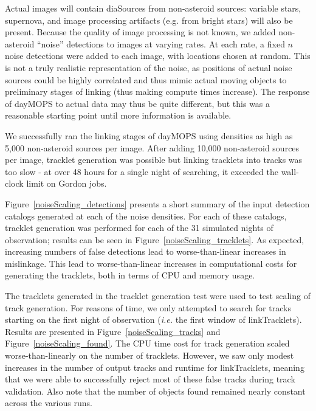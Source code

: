 Actual images will contain diaSources from non-asteroid sources:
variable stars, supernova, and image processing artifacts (e.g. from
bright stars) will also be present.  Because the quality of image
processing is not known, we added non-asteroid ``noise'' detections to
images at varying rates.  At each rate, a fixed $n$ noise detections
were added to each image, with locations chosen at random. This is not
a truly realistic representation of the noise, as positions of actual
noise sources could be highly correlated and thus mimic actual moving
objects to preliminary stages of linking (thus making compute times
increase). The response of dayMOPS to actual data may thus be quite
different, but this was a reasonable starting point until more
information is available. 

We successfully ran the linking stages of dayMOPS using densities as high as 5,000 non-asteroid
sources per image.  After adding 10,000 non-asteroid sources per
image, tracklet generation was possible but linking tracklets into
tracks was too slow - at over 48 hours for a single night of
searching, it exceeded the wall-clock limit on Gordon jobs.

Figure~\ref{noiseScaling_detections} presents a short summary of the input
detection catalogs generated at each of the noise densities.  For each
of these catalogs, tracklet generation was performed for each of the
31 simulated nights of observation; results can be seen in
Figure~\ref{noiseScaling_tracklets}.  As expected, increasing numbers
of false detections lead to worse-than-linear increases in mislinkage.
This lead to worse-than-linear increases in computational costs for generating the
tracklets, both in terms of CPU and memory usage.

The tracklets generated in the tracklet generation test were used to
test scaling of track generation.  For reasons of time, we only
attempted to search for tracks starting on the first night of
observation ({\it i.e.} the first window of linkTracklets).  Results are presented in
Figure~\ref{noiseScaling_tracks} and Figure~\ref{noiseScaling_found}.
The CPU time cost for track generation scaled worse-than-linearly on
the number of tracklets.  However, we saw only modest increases in the
number of output tracks and runtime for linkTracklets, meaning that we
were able to successfully reject most of these false tracks during
track validation.  Also note that
the number of objects found remained nearly constant across the
various runs.


